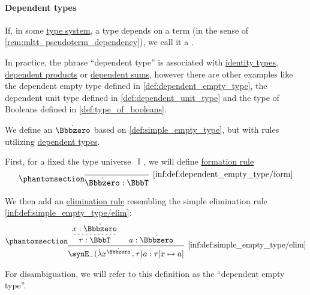 \paragraph{Dependent types}

\begin{concept}\label{con:dependent_type}
  If, in some \hyperref[def:abstract_type_system]{type system}, a type depends on a term (in the sense of \cref{rem:mltt_pseudoterm_dependency}), we call it a .
\end{concept}
\begin{comments}
  \item In practice, the phrase \enquote{dependent type} is associated with \hyperref[def:identity_type]{identity types}, \hyperref[def:dependent_product]{dependent products} or \hyperref[def:dependent_product]{dependent sums}, however there are other examples like the dependent empty type defined in \cref{def:dependent_empty_type}, the dependent unit type defined in \cref{def:dependent_unit_type} and the type of Booleans defined in \cref{def:type_of_booleans}.
\end{comments}

\begin{definition}\label{def:dependent_empty_type}
  We define an  \( \syn\Bbbzero \) based on \cref{def:simple_empty_type}, but with rules utilizing \hyperref[con:dependent_type]{dependent types}.

  First, for a fixed the type universe \( \BbbT \), we will define \hyperref[rem:type_theory_rule_classification/form]{formation rule}
  \begin{equation*}\taglabel[\ensuremath{ \Bbbzero_{\logic{form}} }]{inf:def:dependent_empty_type/form}
    \begin{prooftree}
      \infer0[\ref{inf:def:dependent_empty_type/form}]{ \syn\Bbbzero: \BbbT }
    \end{prooftree}
  \end{equation*}

  We then add an \hyperref[rem:type_theory_rule_classification/elim]{elimination rule} resembling the simple elimination rule \ref{inf:def:simple_empty_type/elim}:
  \begin{equation*}\taglabel[\ensuremath{ \Bbbzero_- }]{inf:def:dependent_empty_type/elim}
    \begin{prooftree}
      \hypo{ x: \syn\Bbbzero }
      \infer[dashed]1{ \tau: \BbbT }

      \hypo{ a: \syn\Bbbzero }

      \infer2[\ref{inf:def:simple_empty_type/elim}]{ \synE_- (\qabs {x^{\syn\Bbbzero}} \tau) a: \tau[x \mapsto a] }
    \end{prooftree}
  \end{equation*}
\end{definition}
\begin{comments}
  \item For disambiguation, we will refer to this definition as the \enquote{dependent empty type}.
\end{comments}


